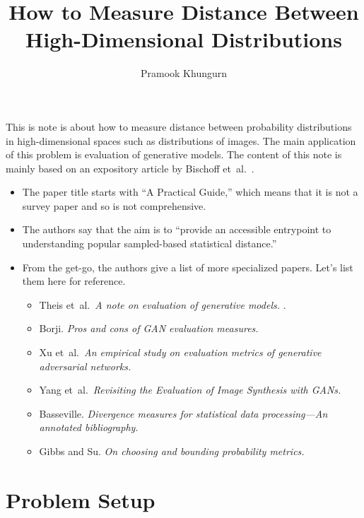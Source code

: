 \documentclass[10pt]{article}
\title{How to Measure Distance Between High-Dimensional Distributions}
\author{Pramook Khungurn}
\newcommand{\etal}{{et~al.}}
\begin{document}
\maketitle

This is note is about how to measure distance between probability distributions in high-dimensional spaces such as distributions of images. The main application of this problem is evaluation of generative models. The content of this note is mainly based on an expository article by Bischoff \etal~\cite{Bischoff:2024}.

\begin{itemize}
    \item The paper title starts with ``A Practical Guide,'' which means that it is not a survey paper and so is not comprehensive. 
    
    \item The authors say that the aim is to ``provide an accessible entrypoint to understanding popular sampled-based statistical distance.''
    
    \item From the get-go, the authors give a list of more specialized papers. Let's list them here for reference.
    
    \begin{itemize}
        \item Theis \etal\ \emph{A note on evaluation of generative models.} \cite{Theis:2016}.
        \item Borji. \emph{Pros and cons of GAN evaluation measures.} \cite{Borji:2018}
        \item Xu \etal\ \emph{An empirical study on evaluation metrics of generative adversarial networks.} \cite{Xu:2018}
        \item Yang \etal\ \emph{Revisiting the Evaluation of Image Synthesis with GANs.} \cite{Yang:2023}
        \item Basseville. \emph{Divergence measures for statistical data processing—An annotated bibliography}. \cite{Basseville:2013}
        \item Gibbs and Su. \emph{On choosing and bounding probability metrics.} \cite{Gibbs:2002}
    \end{itemize}
\end{itemize}

\section{Problem Setup}
\end{document}
